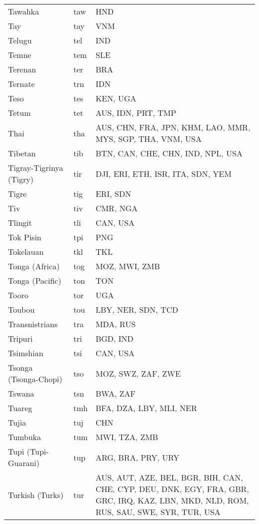 \documentclass[12pt]{article}
\begin{document}
\begin{center}
\begin{longtable}{|p{7cm}|p{1cm}|p{7cm}|}
Tawahka	&	taw	&	HND	\\	\cline{1-3}
Tay	&	tay	&	VNM	\\	\cline{1-3}
Telugu	&	tel 	&	IND	\\	\cline{1-3}
Temne	&	tem 	&	SLE	\\	\cline{1-3}
Terenan	&	ter 	&	BRA	\\	\cline{1-3}
Ternate	&	trn	&	IDN	\\	\cline{1-3}
Teso	&	tes	&	KEN, UGA	\\	\cline{1-3}
Tetum	&	tet 	&	AUS, IDN, PRT, TMP	\\	\cline{1-3}
Thai	&	tha 	&	AUS, CHN,  FRA, JPN, KHM, LAO, MMR, MYS, SGP, THA, VNM, USA	\\	\cline{1-3}
Tibetan	&	tib	&	BTN, CAN, CHE, CHN, IND, NPL, USA	\\	\cline{1-3}
Tigray-Tigrinya (Tigry)	&	tir 	&	DJI, ERI, ETH, ISR, ITA, SDN, YEM	\\	\cline{1-3}
Tigre	&	tig 	&	ERI, SDN	\\	\cline{1-3}
Tiv	&	tiv 	&	CMR, NGA	\\	\cline{1-3}
Tlingit	&	tli 	&	CAN, USA	\\	\cline{1-3}
Tok Pisin	&	tpi 	&	PNG	\\	\cline{1-3}
Tokelauan	&	tkl 	&	TKL	\\	\cline{1-3}
Tonga (Africa)	&	tog 	&	MOZ, MWI, ZMB	\\	\cline{1-3}
Tonga (Pacific)	&	ton 	&	TON	\\	\cline{1-3}
Tooro	&	tor	&	UGA	\\	\cline{1-3}
Toubou	&	tou	&	LBY, NER, SDN, TCD	\\	\cline{1-3}
Transnistrians	&	tra	&	MDA, RUS	\\	\cline{1-3}
Tripuri	&	tri	&	BGD, IND	\\	\cline{1-3}
Tsimshian	&	tsi 	&	CAN, USA	\\	\cline{1-3}
Tsonga (Tsonga-Chopi)	&	tso 	&	MOZ, SWZ, ZAF, ZWE	\\	\cline{1-3}
Tswana	&	tsn 	&	BWA, ZAF	\\	\cline{1-3}
Tuareg	&	tmh 	&	BFA, DZA, LBY, MLI, NER	\\	\cline{1-3}
Tujia	&	tuj	&	CHN	\\	\cline{1-3}
Tumbuka	&	tum 	&	MWI, TZA, ZMB	\\	\cline{1-3}
Tupi (Tupi-Guarani)	&	tup 	&	ARG, BRA, PRY, URY	\\	\cline{1-3}
Turkish (Turks)	&	tur 	&	AUS, AUT, AZE, BEL, BGR, BIH, CAN, CHE, CYP, DEU, DNK, EGY, FRA, GBR, GRC, IRQ, KAZ, LBN, MKD, NLD, ROM, RUS, SAU, SWE, SYR, TUR, USA	\\	\cline{1-3}

\end{longtable}
\end{center}
\end{document}
